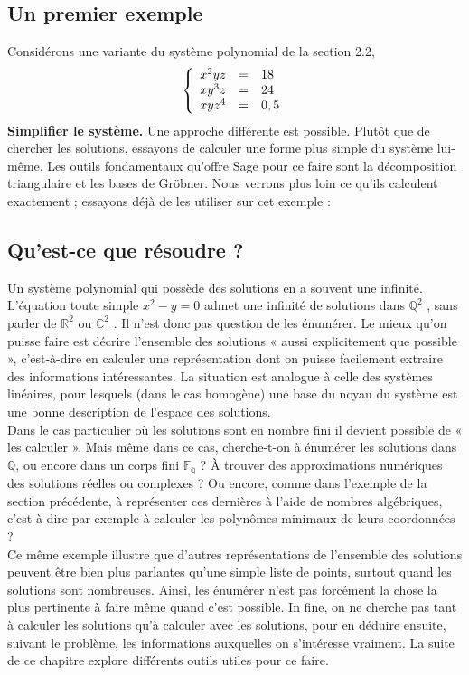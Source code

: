 \subsection{ Un premier exemple}
Considérons une variante du système polynomial de la section 2.2,
\begin{equation}
 \left \{
   \begin{array}{r c l}
      x^{2}yz  & = & 18 \\
      xy^{3}z   & = & 24 \\
      xyz^{4} & = & 0,5
   \end{array}
   \right .
\end{equation}
\textbf{Simplifier le système.} Une approche différente est possible. Plutôt que de chercher les solutions, essayons de calculer une forme plus simple du système lui-même. Les outils fondamentaux qu’offre Sage pour ce faire sont la décomposition triangulaire et les bases de Gröbner. Nous verrons plus loin ce qu’ils calculent
exactement ; essayons déjà de les utiliser sur cet exemple :
\subsection{ Qu’est-ce que résoudre ?}
Un système polynomial qui possède des solutions en a souvent une infinité.
L’équation toute simple $x^{2} - y = 0$ admet une infinité de solutions dans $\mathbb{Q}^{2}$ , sans
parler de $\mathbb{R}^{2}$ ou $\mathbb{C}^{2}$ . Il n’est donc pas question de les énumérer. Le mieux qu’on
puisse faire est décrire l’ensemble des solutions « aussi explicitement que possible »,
c’est-à-dire en calculer une représentation dont on puisse facilement extraire des
informations intéressantes. La situation est analogue à celle des systèmes linéaires,
pour lesquels (dans le cas homogène) une base du noyau du système est une bonne
description de l’espace des solutions.
\\
Dans le cas particulier où les solutions sont en nombre fini il devient possible
de « les calculer ». Mais même dans ce cas, cherche-t-on à énumérer les solutions
dans $\mathbb{Q}$, ou encore dans un corps fini $\mathbb{F_{q}}$ ? À trouver des approximations numériques
des solutions réelles ou complexes ? Ou encore, comme dans l’exemple de la section
précédente, à représenter ces dernières à l’aide de nombres algébriques, c’est-à-dire
par exemple à calculer les polynômes minimaux de leurs coordonnées ?
\\

Ce même exemple illustre que d’autres représentations de l’ensemble des
solutions peuvent être bien plus parlantes qu’une simple liste de points, surtout
quand les solutions sont nombreuses. Ainsi, les énumérer n’est pas forcément la
chose la plus pertinente à faire même quand c’est possible. In fine, on ne cherche
pas tant à calculer les solutions qu’à calculer avec les solutions, pour en déduire
ensuite, suivant le problème, les informations auxquelles on s’intéresse vraiment.
La suite de ce chapitre explore différents outils utiles pour ce faire.
